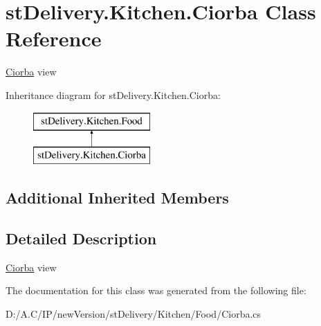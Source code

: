 \hypertarget{classst_delivery_1_1_kitchen_1_1_ciorba}{}\section{st\+Delivery.\+Kitchen.\+Ciorba Class Reference}
\label{classst_delivery_1_1_kitchen_1_1_ciorba}


\hyperlink{classst_delivery_1_1_kitchen_1_1_ciorba}{Ciorba} view  


Inheritance diagram for st\+Delivery.\+Kitchen.\+Ciorba\+:\begin{figure}[H]
\begin{center}
\leavevmode
\includegraphics[height=2.000000cm]{classst_delivery_1_1_kitchen_1_1_ciorba}
\end{center}
\end{figure}
\subsection*{Additional Inherited Members}


\subsection{Detailed Description}
\hyperlink{classst_delivery_1_1_kitchen_1_1_ciorba}{Ciorba} view 



The documentation for this class was generated from the following file\+:\begin{DoxyCompactItemize}
\item 
D\+:/\+A.\+C/\+I\+P/new\+Version/st\+Delivery/\+Kitchen/\+Food/Ciorba.\+cs\end{DoxyCompactItemize}

